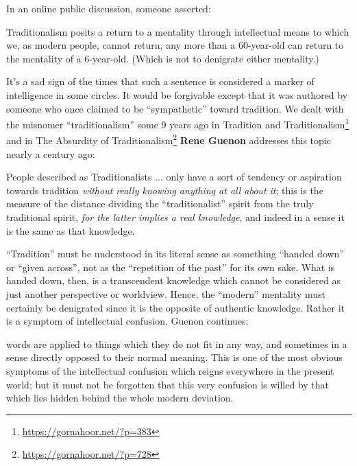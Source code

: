 In an online public discussion, someone asserted:

\begin{quotex}
Traditionalism posits a return to a mentality through intellectual means to which we, as modern people, cannot return, any more than a 60-year-old can return to the mentality of a 6-year-old. (Which is not to denigrate either mentality.)
\end{quotex}


It's a sad sign of the times that such a sentence is considered a marker of intelligence in some circles. It would be forgivable except that it was authored by someone who once claimed to be ``sympathetic'' toward tradition. We dealt with the misnomer ``traditionalism'' some 9 years ago in Tradition and Traditionalism\footnote{\url{https://gornahoor.net/?p=383}} and in The Absurdity of Traditionalism\footnote{\url{https://gornahoor.net/?p=728}} \textbf{Rene Guenon} addresses this topic nearly a century ago:

\begin{quotex}
People described as Traditionalists ... only have a sort of tendency or aspiration towards tradition \emph{without really knowing anything at all about it}; this is the measure of the distance dividing the ``traditionalist'' spirit from the truly traditional spirit,
\emph{for the latter implies a real knowledge}, and indeed in a sense it is the same as that knowledge.
\end{quotex}


``Tradition'' must be understood in its literal sense as something ``handed down'' or ``given across'', not as the ``repetition of the past'' for its own sake. What is handed down, then, is a transcendent knowledge which cannot be considered as just another perspective or worldview. Hence, the ``modern'' mentality must certainly be denigrated since it is the opposite of authentic knowledge. Rather it is a symptom of intellectual confusion. Guenon continues:

\begin{quotex}
words are applied to things which they do not fit in any way, and sometimes in a sense directly opposed to their normal meaning. This is one of the most obvious symptoms of the intellectual confusion which reigns everywhere in the present world; but it must not be forgotten that this very confusion is willed by that which lies hidden behind the whole modern deviation.
\end{quotex}


